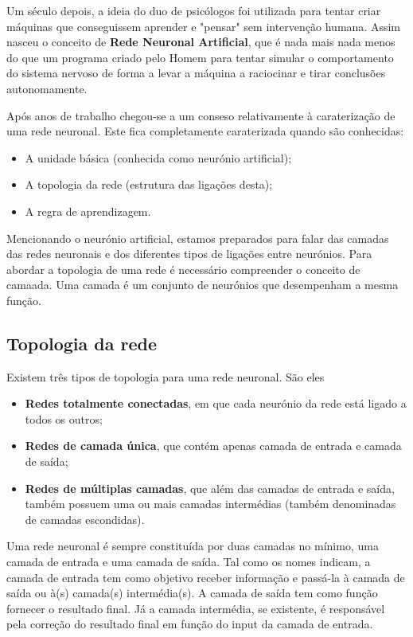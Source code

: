\documentclass[10pt,a4paper]{article}
\begin{document}
Um século depois, a ideia do duo de psicólogos foi utilizada para tentar criar máquinas que conseguissem aprender e "pensar" sem intervenção humana. Assim nasceu o conceito de \textbf{Rede Neuronal Artificial}, que é nada mais nada menos do que um programa criado pelo Homem para tentar simular o comportamento do sistema nervoso de forma a levar a máquina a raciocinar e tirar conclusões autonomamente.

Após anos de trabalho chegou-se a um conseso relativamente à caraterização de uma rede neuronal. Este fica completamente caraterizada quando são conhecidas:
\begin{itemize}
\item A unidade básica (conhecida como neurónio artificial);
\item A topologia da rede (estrutura das ligações desta);
\item A regra de aprendizagem.
\end{itemize}

Mencionando o neurónio artificial, estamos preparados para falar das camadas das redes neuronais e dos diferentes tipos de ligações entre neurónios.
Para abordar a topologia de uma rede é necessário compreender o conceito de camaada. Uma camada é um conjunto de neurónios que desempenham a mesma função.

\subsection{Topologia da rede}
Existem três tipos de topologia para uma rede neuronal. São eles
\begin{itemize}
\item \textbf{Redes totalmente conectadas}, em que cada neurónio da rede está ligado a todos os outros;
\item \textbf{Redes de camada única}, que contém apenas camada de entrada e camada de saída;
\item \textbf{Redes de múltiplas camadas}, que além das camadas de entrada e saída, também possuem uma ou mais camadas intermédias (também denominadas de camadas escondidas).
\end{itemize}


Uma rede neuronal é sempre constituída por duas camadas no mínimo, uma camada de entrada e uma camada de saída. Tal como os nomes indicam, a camada de entrada tem como objetivo receber informação e passá-la à camada de saída ou à(s) camada(s) intermédia(s). A camada de saída tem como função fornecer o resultado final. Já a camada intermédia, se existente, é responsável pela correção do resultado final em função do input da camada de entrada.
\end{document}
